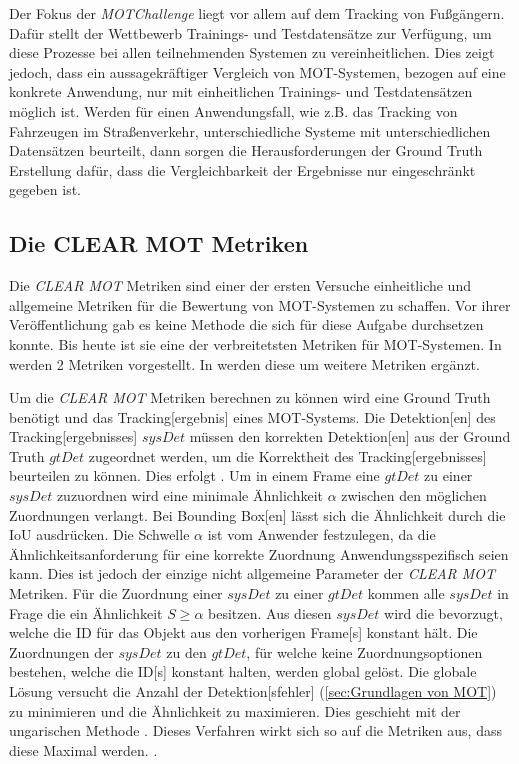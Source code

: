 Der Fokus der \textit{MOTChallenge} liegt vor allem auf dem \gls{Tracking} von Fußgängern. Dafür stellt der Wettbewerb Trainings- und Testdatensätze zur Verfügung, um diese Prozesse bei allen teilnehmenden Systemen zu vereinheitlichen. Dies zeigt jedoch, dass ein aussagekräftiger Vergleich von \gls{MOT}-Systemen, bezogen auf eine konkrete Anwendung, nur mit einheitlichen Trainings- und Testdatensätzen möglich ist. Werden für einen Anwendungsfall, wie z.B. das \gls{Tracking} von Fahrzeugen im Straßenverkehr, unterschiedliche Systeme mit unterschiedlichen Datensätzen beurteilt, dann sorgen die Herausforderungen der \gls{Ground Truth} Erstellung dafür, dass die Vergleichbarkeit der Ergebnisse nur eingeschränkt gegeben ist. 

\subsection{Die CLEAR MOT Metriken}
Die \textit{\acrshort{CLEAR} \gls{MOT}} Metriken sind einer der ersten Versuche einheitliche und allgemeine Metriken für die Bewertung von \gls{MOT}-Systemen zu schaffen. Vor ihrer Veröffentlichung gab es keine Methode die sich für diese Aufgabe durchsetzen konnte. Bis heute ist sie eine der verbreitetsten Metriken für \gls{MOT}-Systemen. In \cite{CLEAR.2008} werden 2 Metriken vorgestellt. In \cite{Kasturi.2009} werden diese um weitere Metriken ergänzt. \par

Um die \textit{\acrshort{CLEAR} \gls{MOT}} Metriken berechnen zu können wird eine \gls{Ground Truth} benötigt und das \gls{Tracking}[ergebnis] eines \gls{MOT}-Systems. Die \gls{Detektion}[en] des \gls{Tracking}[ergebnisses] \(sysDet\) müssen den korrekten \gls{Detektion}[en] aus der \gls{Ground Truth} \(gtDet\) zugeordnet werden, um die Korrektheit des \gls{Tracking}[ergebnisses] beurteilen zu können. Dies erfolgt . Um in einem \gls{Frame} eine \(gtDet\) zu einer \(sysDet\) zuzuordnen wird eine minimale Ähnlichkeit \(\alpha\) zwischen den möglichen Zuordnungen verlangt. Bei \gls{Bounding Box}[en] lässt sich die Ähnlichkeit durch die \gls{IoU} ausdrücken. Die Schwelle \(\alpha\) ist vom Anwender festzulegen, da die Ähnlichkeitsanforderung für eine korrekte Zuordnung Anwendungsspezifisch seien kann. Dies ist jedoch der einzige nicht allgemeine Parameter der \textit{\acrshort{CLEAR} \gls{MOT}} Metriken. Für die Zuordnung einer \(sysDet\) zu einer \(gtDet\) kommen alle \(sysDet\) in Frage die ein Ähnlichkeit \(S \geq \alpha\) besitzen. Aus diesen \(sysDet\) wird die bevorzugt, welche die \acrshort{ID} für das Objekt aus den vorherigen \gls{Frame}[s] konstant hält. Die Zuordnungen der \(sysDet\) zu den  \(gtDet\), für welche keine Zuordnungsoptionen bestehen, welche die \acrshort{ID}[s] konstant halten, werden global gelöst. Die globale Lösung versucht die Anzahl der \gls{Detektion}[sfehler] (\ref{sec:Grundlagen von MOT}) zu minimieren und die Ähnlichkeit zu maximieren. Dies geschieht mit der ungarischen Methode \cite{Kuhn.1955}. Dieses Verfahren wirkt sich so auf die Metriken aus, dass diese Maximal werden. \cite{CLEAR.2008, HOTA}. \par

